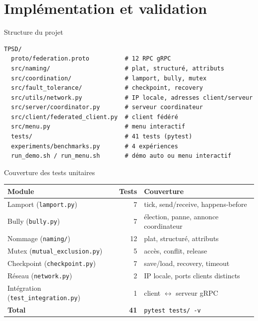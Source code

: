\documentclass[11pt,french]{beamer}
\begin{document}
\section{Implémentation et validation}

\begin{frame}[fragile]{Structure du projet}
  \small
  \begin{verbatim}
TPSD/
  proto/federation.proto          # 12 RPC gRPC
  src/naming/                     # plat, structuré, attributs
  src/coordination/               # lamport, bully, mutex
  src/fault_tolerance/            # checkpoint, recovery
  src/utils/network.py            # IP locale, adresses client/serveur
  src/server/coordinator.py       # serveur coordinateur
  src/client/federated_client.py  # client fédéré
  src/menu.py                     # menu interactif
  tests/                          # 41 tests (pytest)
  experiments/benchmarks.py       # 4 expériences
  run_demo.sh / run_menu.sh       # démo auto ou menu interactif
  \end{verbatim}
\end{frame}

\begin{frame}{Couverture des tests unitaires}
  \small
  \begin{tabular}{@{}lrl@{}}
    \toprule
    \textbf{Module} & \textbf{Tests} & \textbf{Couverture} \\
    \midrule
    Lamport (\texttt{lamport.py}) & 7 & tick, send/receive, happens-before \\
    Bully (\texttt{bully.py}) & 7 & élection, panne, annonce coordinateur \\
    Nommage (\texttt{naming/}) & 12 & plat, structuré, attributs \\
    Mutex (\texttt{mutual\_exclusion.py}) & 5 & accès, conflit, release \\
    Checkpoint (\texttt{checkpoint.py}) & 7 & save/load, recovery, timeout \\
    Réseau (\texttt{network.py}) & 2 & IP locale, ports clients distincts \\
  Intégration (\texttt{test\_integration.py}) & 1 & client $\leftrightarrow$ serveur gRPC \\
    \midrule
    \textbf{Total} & \textbf{41} & \texttt{pytest tests/ -v} \\
    \bottomrule
  \end{tabular}
\end{frame}
\end{document}
